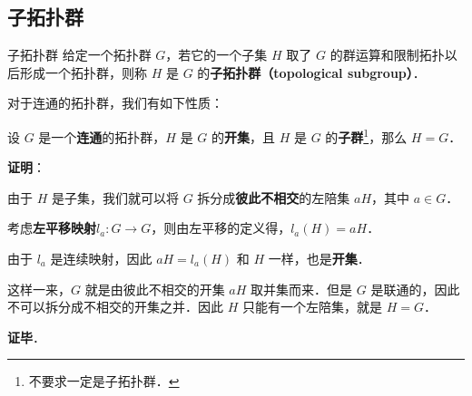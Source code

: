 
\subsection{子拓扑群}

\begin{definition}{子拓扑群}
给定一个拓扑群 $G$，若它的一个子集 $H$ 取了 $G$ 的群运算和限制拓扑以后形成一个拓扑群，则称 $H$ 是 $G$ 的\textbf{子拓扑群（topological subgroup）}．
\end{definition}

对于连通的拓扑群，我们有如下性质：

\begin{theorem}{}\label{TopGrp_the1}
设 $G$ 是一个\textbf{连通}的拓扑群，$H$ 是 $G$ 的\textbf{开集}，且 $H$ 是 $G$ 的\textbf{子群}\footnote{不要求一定是子拓扑群．}，那么 $H=G$．
\end{theorem}

\textbf{证明}：

由于 $H$ 是子集，我们就可以将 $G$ 拆分成\textbf{彼此不相交}的左陪集 $aH$，其中 $a\in G$．

考虑\textbf{左平移映射}$l_a:G\to G$，则由左平移的定义得，$l_a(H)=aH$．

由于 $l_a$ 是连续映射，因此 $aH=l_a(H)$ 和 $H$ 一样，也是\textbf{开集}．

这样一来，$G$ 就是由彼此不相交的开集 $aH$ 取并集而来．但是 $G$ 是联通的，因此不可以拆分成不相交的开集之并．因此 $H$ 只能有一个左陪集，就是 $H=G$．

\textbf{证毕}．




